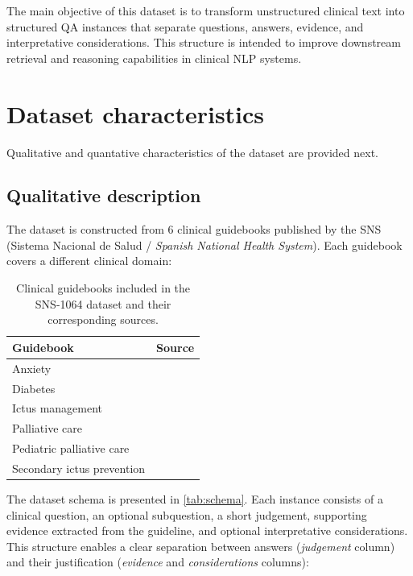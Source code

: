 \documentclass[11pt,a4paper]{article}
\begin{document}
The main objective of this dataset is to transform unstructured clinical text into structured QA instances that separate questions, answers, evidence, and interpretative considerations. This structure is intended to improve downstream retrieval and reasoning capabilities in clinical NLP systems.

\section{Dataset characteristics}

Qualitative and quantative characteristics of the dataset are provided next.

\subsection{Qualitative description}

The dataset is constructed from 6 clinical guidebooks published by the SNS (Sistema Nacional de Salud / \textit{Spanish National Health System}). Each guidebook covers a different clinical domain:

\begin{table}[H]
\centering
\small
\begin{tabular}{ll}
\toprule
\textbf{Guidebook} & \textbf{Source} \\
\midrule
Anxiety & \citet{ansiedad} \\
Diabetes & \citet{diabetes} \\
Ictus management & \citet{ictus} \\
Palliative care & \citet{paliativos} \\
Pediatric palliative care & \citet{paliativos_pediatria} \\
Secondary ictus prevention & \citet{prevencion_ictus} \\
\bottomrule
\end{tabular}
\caption{Clinical guidebooks included in the SNS-1064 dataset and their corresponding sources.}
\label{tab:clinical_domains}
\end{table}

The dataset schema is presented in \autoref{tab:schema}. Each instance consists of a clinical question, an optional subquestion, a short judgement, supporting evidence extracted from the guideline, and optional interpretative considerations. This structure enables a clear separation between \linebreak answers (\textit{judgement} column) and their justification (\textit{evidence} and \textit{considerations} columns):
\end{document}
